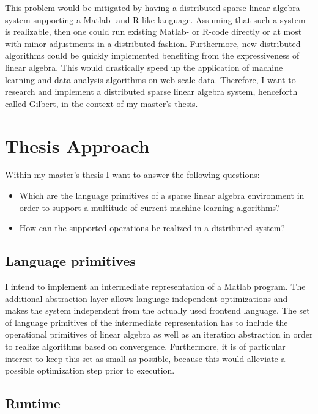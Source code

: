 \documentclass{dima}
\begin{document}
This problem would be mitigated by having a distributed sparse linear algebra system supporting a Matlab- and R-like language.
Assuming that such a system is realizable, then one could run existing Matlab- or R-code directly or at most with minor adjustments in a distributed fashion.
Furthermore, new distributed algorithms could be quickly implemented benefiting from the expressiveness of linear algebra.
This would drastically speed up the application of machine learning and data analysis algorithms on web-scale data.
Therefore, I want to research and implement a distributed sparse linear algebra system, henceforth called Gilbert, in the context of my master's thesis.


\section{Thesis Approach}

Within my master's thesis I want to answer the following questions:
\begin{itemize}
\item Which are the language primitives of a sparse linear algebra environment in order to support a multitude of current machine learning algorithms?
\item How can the supported operations be realized in a distributed system?
\end{itemize}

\subsection{Language primitives}

I intend to implement an intermediate representation of a Matlab program.
The additional abstraction layer allows language independent optimizations and makes the system independent from the actually used frontend language.
The set of language primitives of the intermediate representation has to include the operational primitives of linear algebra as well as an iteration abstraction in order to realize algorithms based on convergence.
Furthermore, it is of particular interest to keep this set as small as possible, because this would alleviate a possible optimization step prior to execution.

\subsection{Runtime}
\end{document}
